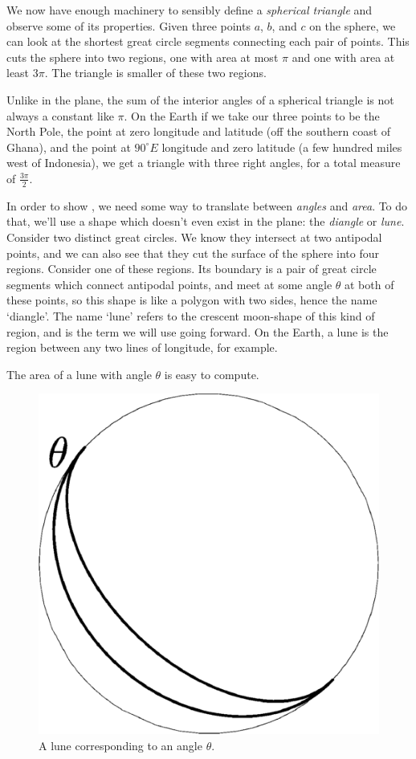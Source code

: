 We now have enough machinery to sensibly define a \textit{spherical triangle} and observe some of its properties. Given three points $a$, $b$, and $c$ on the sphere, we can look at the shortest great circle segments connecting each pair of points.  This cuts the sphere into two regions, one with area at most $\pi$ and one with area at least $3\pi$.  The triangle is smaller of these two regions.


Unlike in the plane, the sum of the interior angles of a spherical triangle is not always a constant like $\pi$.  On the Earth if we take our three points to be the North Pole, the point at zero longitude and latitude (off the southern coast of Ghana), and the point at $90^\circ E$ longitude and zero latitude (a few hundred miles west of Indonesia), we get a triangle with three right angles, for a total measure of $\tfrac{3\pi}{2}$.



In order to  show , we need some way to translate between \textit{angles} and \textit{area}.  To do that, we'll use a shape which doesn't even exist in the plane: the \textit{diangle} or \textit{lune}.  Consider two distinct great circles.  We know they intersect at two antipodal points, and we can also see that they cut the surface of the sphere into four regions.  Consider one of these regions.  Its boundary is a pair of great circle segments which connect antipodal points, and meet at some angle $\theta$ at both of these points, so this shape is like a polygon with two sides, hence the name `diangle'.  The name `lune' refers to the crescent moon-shape of this kind of region, and is the term we will use going forward.  On the Earth, a lune is the region between any two lines of longitude, for example.

The area of a lune with angle $\theta$ is easy to compute.


\begin{figure}[htb]
	\centering
	\includegraphics[width=.35\textwidth]{figs/lune.pdf}
	\caption{A lune corresponding to an angle $\theta$. }
	\label{fig:lune}
\end{figure}

